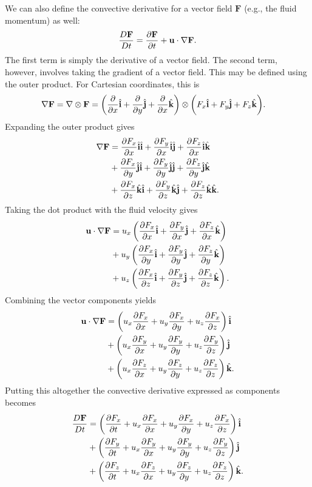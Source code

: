 We can also define the convective derivative for a vector field $\mathbf{F}$ (e.g., the fluid momentum) as well:
\begin{align}
  \frac{D\mathbf{F}}{Dt} = \dho{\mathbf{F}}{t} + \mathbf{u} \cdot \nabla \mathbf{F} .
\end{align}
The first term is simply the derivative of a vector field. The second term, however, involves taking the gradient of a vector field. This may be defined using the outer product. For Cartesian coordinates, this is
\begin{align}
  \nabla \mathbf{F} &= \nabla \otimes \mathbf{F}
  = \left( \dho{}{x} \ihat + \dho{}{y} \jhat + \dho{}{x} \khat \right) \otimes \bigg( F_x \ihat + F_y \jhat + F_z \khat \bigg) .
\end{align}
Expanding the outer product gives
\begin{align}
  \nabla \mathbf{F} 
  &= \dho{F_x}{x} \ihat \ihat + \dho{F_y}{x} \ihat \jhat + \dho{F_z}{x} \ihat \khat \nonumber \\
  &+ \dho{F_x}{y} \jhat \ihat + \dho{F_y}{y} \jhat \jhat + \dho{F_z}{y} \jhat \khat \nonumber \\
  &+ \dho{F_x}{z} \khat \ihat + \dho{F_y}{z} \khat \jhat + \dho{F_z}{z} \khat \khat .
\end{align}
Taking the dot product with the fluid velocity gives
\begin{align}
  \mathbf{u} \cdot \nabla \mathbf{F} 
  &= u_x \left( \dho{F_x}{x} \ihat + \dho{F_y}{x} \jhat + \dho{F_z}{x} \khat \right) \nonumber \\
  &+ u_y \left( \dho{F_x}{y} \ihat + \dho{F_y}{y} \jhat + \dho{F_z}{y} \khat \right) \nonumber \\
  &+ u_z \left( \dho{F_x}{z} \ihat + \dho{F_y}{z} \jhat + \dho{F_z}{z} \khat \right) .
\end{align}
Combining the vector components yields
\begin{align}
  \mathbf{u} \cdot \nabla \mathbf{F} 
  &= \left( u_x \dho{F_x}{x} + u_y \dho{F_x}{y} + u_z \dho{F_x}{z} \right) \ihat \nonumber \\
  &+ \left( u_x \dho{F_y}{x} + u_y \dho{F_y}{y} + u_z \dho{F_y}{z} \right) \jhat \nonumber \\
  &+ \left( u_x \dho{F_z}{x} + u_y \dho{F_z}{y} + u_z \dho{F_z}{z} \right) \khat .
\end{align}
Putting this altogether the convective derivative expressed as components becomes
\begin{align}
  \frac{D\mathbf{F}}{Dt} 
  &= \left( \dho{F_x}{t} + u_x \dho{F_x}{x} + u_y \dho{F_x}{y} + u_z \dho{F_x}{z} \right) \ihat \nonumber \\
  &+ \left( \dho{F_y}{t} + u_x \dho{F_y}{x} + u_y \dho{F_y}{y} + u_z \dho{F_y}{z} \right) \jhat \nonumber \\
  &+ \left( \dho{F_z}{t} + u_x \dho{F_z}{x} + u_y \dho{F_z}{y} + u_z \dho{F_z}{z} \right) \khat .
\end{align}

